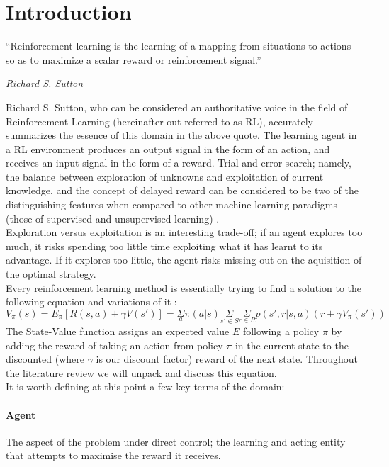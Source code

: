 \documentclass[12pt]{article}
\begin{document}
\newpage
\setcounter{page}{1}

\section{Introduction}
\epigraph{``Reinforcement learning is the learning of a mapping from situations to actions so as to
maximize a scalar reward or reinforcement signal.''}{\textit{Richard S. Sutton}}  
Richard S. Sutton, who can be considered an authoritative voice in the field of Reinforcement Learning (hereinafter out referred to as RL), accurately summarizes the essence of this domain in the above quote. The learning agent in a RL environment produces an output signal in the form of an action, and receives an input signal in the form of a reward.
Trial-and-error search; namely, the balance between exploration of unknowns and exploitation of current knowledge, and the concept of delayed reward can be considered to be two of the
distinguishing features when compared to other machine learning paradigms (those of supervised and unsupervised learning) \autocite{Sutton2012-uz}.\\\newline 
Exploration versus exploitation is an interesting trade-off; if an agent explores too much, it risks spending too little time exploiting what it has learnt to its advantage. If it explores too little, the agent risks missing out on the aquisition of the optimal strategy.
\\\newline Every reinforcement learning method is essentially trying to find a solution to the following equation and variations of it \autocite{10.5555/3312046}:
\begin{equation}\label{sve}
        V_{\pi}(s) = E_\pi[R(s,a) + \gamma V(s')]=\underset{a}{\Sigma}\pi(a|s)\underset{s'\in S}{\Sigma}\underset{r\in R}{\Sigma}p(s',r|s,a)(r+\gamma V_\pi(s'))
\end{equation}
The State-Value function assigns an expected value $E$ following a policy $\pi$ by adding the reward of taking an action from policy $\pi$ in the current state to the discounted (where $\gamma$ is our discount factor) reward of the next state. Throughout the literature review we will unpack and discuss this equation.\\\newline
It is worth defining at this point a few key terms of the domain:
\paragraph{Agent} The aspect of the problem under direct control; the learning and acting entity that attempts to maximise the reward it receives.
\end{document}
